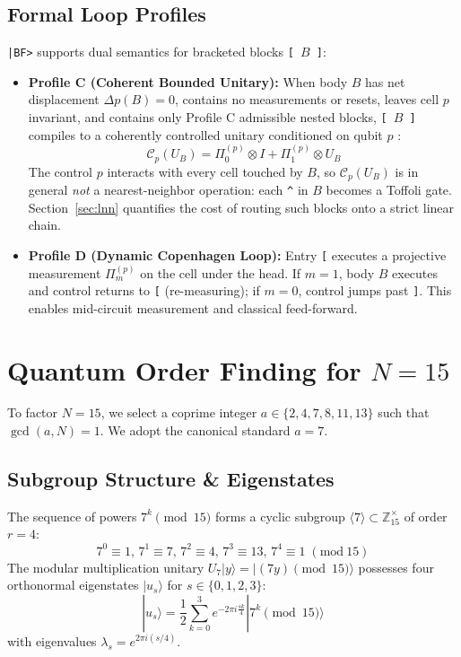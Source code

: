 \documentclass[11pt,a4paper,twocolumn]{article}
\newcommand{\ket}[1]{| #1 \rangle}
\begin{document}
\subsection{Formal Loop Profiles}
\texttt{|BF>} supports dual semantics for bracketed blocks \texttt{[ $B$ ]}:
\begin{itemize}
    \item \textbf{Profile C (Coherent Bounded Unitary):} When body $B$ has net displacement $\Delta p(B) = 0$, contains no measurements or resets, leaves cell $p$ invariant, and contains only Profile C admissible nested blocks, \texttt{[ $B$ ]} compiles to a coherently controlled unitary conditioned on qubit $p$ \cite{barenco1995elementary}:
    \begin{equation}
        \mathcal{C}_p(U_B) = \Pi_0^{(p)} \otimes I + \Pi_1^{(p)} \otimes U_B
    \end{equation}
    The control $p$ interacts with every cell touched by $B$, so $\mathcal{C}_p(U_B)$ is in general \emph{not} a nearest-neighbor operation: each \texttt{\^{}} in $B$ becomes a Toffoli gate. Section~\ref{sec:lnn} quantifies the cost of routing such blocks onto a strict linear chain.
    \item \textbf{Profile D (Dynamic Copenhagen Loop):} Entry \texttt{[} executes a projective measurement $\Pi_m^{(p)}$ on the cell under the head. If $m=1$, body $B$ executes and control returns to \texttt{[} (re-measuring); if $m=0$, control jumps past \texttt{]}. This enables mid-circuit measurement and classical feed-forward.
\end{itemize}

\section{Quantum Order Finding for $N = 15$}

To factor $N = 15$, we select a coprime integer $a \in \{2, 4, 7, 8, 11, 13\}$ such that $\gcd(a, N) = 1$. We adopt the canonical standard $a = 7$.

\subsection{Subgroup Structure \& Eigenstates}
The sequence of powers $7^k \pmod{15}$ forms a cyclic subgroup $\langle 7 \rangle \subset \mathbb{Z}_{15}^\times$ of order $r = 4$:
\begin{equation}
    7^0{\equiv}1,\, 7^1{\equiv}7,\, 7^2{\equiv}4,\, 7^3{\equiv}13,\, 7^4{\equiv}1 \; (\mathrm{mod}\ 15)
\end{equation}
The modular multiplication unitary $U_7 \ket{y} = \ket{(7y) \pmod{15}}$ possesses four orthonormal eigenstates $\ket{u_s}$ for $s \in \{0, 1, 2, 3\}$:
\begin{equation}
    \ket{u_s} = \frac{1}{2}\sum_{k=0}^3 e^{-2\pi i \frac{s k}{4}} \ket{7^k \pmod{15}}
\end{equation}
with eigenvalues $\lambda_s = e^{2\pi i (s/4)}$.
\end{document}
